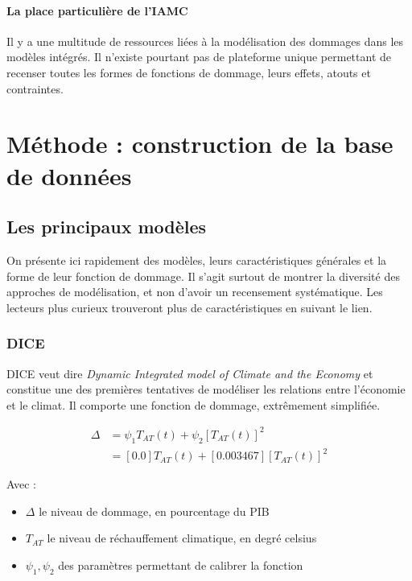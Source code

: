 \paragraph{La place particulière de l'IAMC}


Il y a une multitude de ressources liées à la modélisation des dommages dans les modèles intégrés. Il n'existe pourtant pas de plateforme unique permettant de recenser toutes les formes de fonctions de dommage, leurs effets, atouts et contraintes. 

\section{Méthode : construction de la base de données}



\subsection{Les principaux modèles}

On présente ici rapidement des modèles, leurs caractéristiques générales et la forme de leur fonction de dommage. Il s'agit surtout de montrer la diversité des approches de modélisation, et non d'avoir un recensement systématique. Les lecteurs plus curieux trouveront plus de caractéristiques en suivant le lien. 

\subsubsection{DICE}

DICE veut dire \emph{Dynamic Integrated model of Climate and the  Economy} et constitue une des premières tentatives de modéliser les relations entre l'économie et le climat. Il comporte une fonction de dommage, extrêmement simplifiée. 

\begin{equation}
\begin{array}{ll}
     \displaystyle  \Delta  & = \psi_{1}T_{AT}(t) + \psi_{2}[T_{AT}(t)]^{2} \\
    & = [0.0]T_{AT}(t) + [0.003467][T_{AT}(t)]^{2}
\end{array}
\label{eq:df_dice2023}
\end{equation}

Avec : 
\begin{itemize}
    \item $\Delta$ le niveau de dommage, en pourcentage du PIB
    \item $T_{AT}$ le niveau de réchauffement climatique, en degré celsius
    \item $\psi_1, \psi_2$ des paramètres permettant de calibrer la fonction
\end{itemize}

